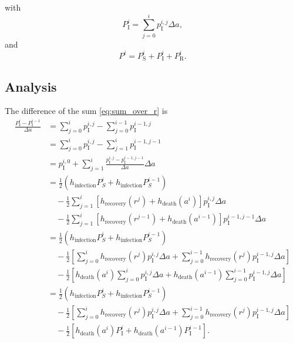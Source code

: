 \documentclass[12pt]{article}
\begin{document}
with
\begin{equation}
  \label{eq:sum_over_r}
  P_{\mathrm{I}}^i
  = \sum_{j = 0}^i p_{\mathrm{I}}^{i, j} \Delta a,
\end{equation}
and
\begin{equation}
  P^i =  P_{\mathrm{S}}^i + P_{\mathrm{I}}^i + P_{\mathrm{R}}^i.
\end{equation}


\subsection{Analysis}

The difference of the sum \eqref{eq:sum_over_r} is
\begin{equation}
  \label{eq:sum_difference}
  \begin{split}
    \frac{P_{\mathrm{I}}^i - P_{\mathrm{I}}^{i - 1}}{\Delta a}
    &=
    \sum_{j = 0}^i p_{\mathrm{I}}^{i, j}
    - \sum_{j = 0}^{i - 1} p_{\mathrm{I}}^{i - 1, j}
    \\
    &=
    \sum_{j = 0}^i p_{\mathrm{I}}^{i, j}
    - \sum_{j = 1}^i p_{\mathrm{I}}^{i - 1, j - 1}
    \\
    &= p_{\mathrm{I}}^{i, 0}
    + \sum_{j = 1}^i
    \frac{p_{\mathrm{I}}^{i, j} - p_{\mathrm{I}}^{i - 1, j - 1}}
    {\Delta a} \Delta a
    \\
    &= \frac{1}{2} \left(h_{\text{infection}} P_S^i
      + h_{\text{infection}} P_S^{i - 1}\right)
    \\ & \quad {}
    - \frac{1}{2} \sum_{j = 1}^i
    \left[h_{\text{recovery}}(r^j) + h_{\text{death}}(a^i)\right]
    p_{\mathrm{I}}^{i, j} \Delta a
    \\ & \quad {}
    - \frac{1}{2} \sum_{j = 1}^i
    \left[h_{\text{recovery}}(r^{j - 1}) + h_{\text{death}}(a^{i - 1})\right]
    p_{\mathrm{I}}^{i - 1, j - 1} \Delta a
    \\
    &= \frac{1}{2} \left(h_{\text{infection}} P_S^i
      + h_{\text{infection}} P_S^{i - 1}\right)
    \\ & \quad {}
    - \frac{1}{2} \left[
      \sum_{j = 0}^i h_{\text{recovery}}(r^j)
      p_{\mathrm{I}}^{i, j} \Delta a
      + \sum_{j = 0}^{i - 1} h_{\text{recovery}}(r^j)
      p_{\mathrm{I}}^{i - 1, j} \Delta a
    \right]
    \\ & \quad {}
    - \frac{1}{2} \left[
      h_{\text{death}}(a^i)
      \sum_{j = 0}^i p_{\mathrm{I}}^{i, j} \Delta a
      + h_{\text{death}}(a^{i - 1})
      \sum_{j = 0}^{i - 1} p_{\mathrm{I}}^{i - 1, j} \Delta a
    \right]
    \\
    &= \frac{1}{2} \left(h_{\text{infection}} P_S^i
      + h_{\text{infection}} P_S^{i - 1}\right)
    \\ & \quad {}
    - \frac{1}{2} \left[
      \sum_{j = 0}^i h_{\text{recovery}}(r^j)
      p_{\mathrm{I}}^{i, j} \Delta a
      + \sum_{j = 0}^{i - 1} h_{\text{recovery}}(r^j)
      p_{\mathrm{I}}^{i - 1, j} \Delta a
    \right]
    \\ & \quad {}
    - \frac{1}{2} \left[
      h_{\text{death}}(a^i) P_{\mathrm{I}}^i
      + h_{\text{death}}(a^{i - 1}) P_{\mathrm{I}}^{i - 1}
    \right].
  \end{split}
\end{equation}
\end{document}

